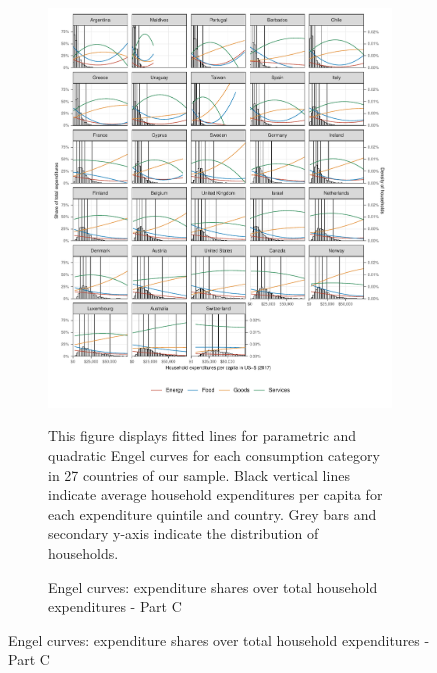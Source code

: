 \begin{figure}[ht!]\ContinuedFloat
   \begin{subfigure}[b]{\textwidth}
  \centering
  \includegraphics{1_Figures/Analysis_Parametric_Engel_Curves/Parametric_EC_0_C.pdf}
  \caption{Engel curves: expenditure shares over total household expenditures - Part C} \label{fig:Engel_3}
  \begin{subcaption2}
    This figure displays fitted lines for parametric and quadratic Engel curves for each consumption category in 27 countries of our sample. Black vertical lines indicate average household expenditures per capita for each expenditure quintile and country. Grey bars and secondary y-axis indicate the distribution of households.
  \end{subcaption2}
\end{subfigure}
\end{figure}


